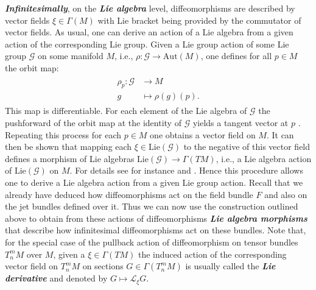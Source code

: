 \textit{\textbf{Infinitesimally}}, on the \textbf{\textit{Lie algebra}} level, diffeomorphisms are described by vector fields $\xi \in \Gamma(M)$ with Lie bracket being provided by the commutator of vector fields. 
As usual, one can derive an action of a Lie algebra from a given action of the corresponding Lie group.
Given a Lie group action of some Lie group $\mathcal{G}$ on some manifold $M$, i.e., $\rho : \mathcal{G} \rightarrow \mathrm{Aut}(M)$, one defines for all $p \in M$ the orbit map:
\begin{align}
    \begin{aligned}
    \rho_p : \mathcal{G} &\longrightarrow M \\
    g &\longmapsto \rho(g)(p).
    \end{aligned}
\end{align}
This map is differentiable. For each element of the Lie algebra of $\mathcal{G}$ the pushforward of the orbit map at the identity of $\mathcal{G}$ yields a tangent vector at $p$ . Repeating this process for each $p \in M$ one obtains a vector field on $M$. It can then be shown that mapping each $\xi \in \mathrm{Lie}(\mathcal{G})$ to the negative of this vector field defines a morphism of Lie algebras $\mathrm{Lie}(\mathcal{G}) \rightarrow \Gamma(TM)$, i.e., a Lie algebra action of $\mathrm{Lie}(\mathcal{G})$ on $M$. For details see for instance \cite{boothby1989} and \cite{doi:10.1142/3867}.
Hence this procedure allows one to derive a Lie algebra action from a given Lie group action. Recall that we already have deduced how diffeomorphisms act on the field bundle $F$ and also on the jet bundles defined over it. Thus we can now use the construction outlined above to obtain from these actions of diffeomorphisms \textit{\textbf{Lie algebra morphisms}} that describe how infinitesimal diffeomorphisms act on these bundles.
Note that, for the special case of the pullback action of diffeomorphism on tensor bundles $T^m_nM$ over $M$, given a $\xi \in \Gamma(TM)$ the induced action of the corresponding vector field on $T^m_nM$ on sections $G \in \Gamma(T^m_nM)$ is usually called the \textit{\textbf{Lie derivative}} and denoted by $G \mapsto \mathcal{L}_{\xi}G$. 

